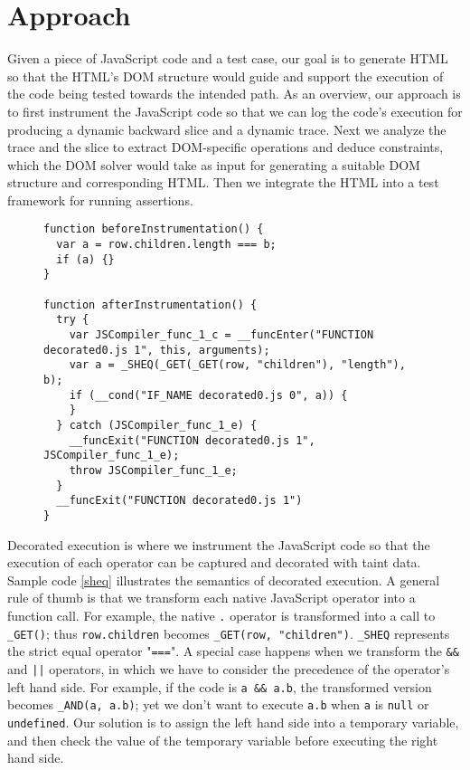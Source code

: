 \section{Approach}
Given a piece of JavaScript code and a test case, our goal is to generate HTML so that the HTML's DOM structure would guide and support the execution of the code being tested towards the intended path.  
As an overview, our approach is to first instrument the JavaScript code so that we can log the code's execution for producing a dynamic backward slice and a dynamic trace.  
Next we analyze the trace and the slice to extract DOM-specific operations and deduce constraints, which the DOM solver would take as input for generating a suitable DOM structure and corresponding HTML.  
Then we integrate the HTML into a test framework for running assertions.  


\begin{figure}
\begin{lstlisting}[caption=Example showing how code is decorated execution for dynamic tracing and dynamic backward slicing,label=sheq]  
function beforeInstrumentation() {
  var a = row.children.length === b; 
  if (a) {}
}

function afterInstrumentation() {
  try {
    var JSCompiler_func_1_c = __funcEnter("FUNCTION decorated0.js 1", this, arguments);
    var a = _SHEQ(_GET(_GET(row, "children"), "length"), b);
    if (__cond("IF_NAME decorated0.js 0", a)) {
    }
  } catch (JSCompiler_func_1_e) {
    __funcExit("FUNCTION decorated0.js 1", JSCompiler_func_1_e);
    throw JSCompiler_func_1_e;
  }
  __funcExit("FUNCTION decorated0.js 1")
}
\end{lstlisting}
\end{figure}

Decorated execution is where we instrument the JavaScript code so that the execution of each operator can be captured and decorated with taint data.  Sample code \ref{sheq} illustrates the semantics of decorated execution.  
A general rule of thumb is that we transform each native JavaScript operator into a function call.  For example, the native {\tt .} operator is transformed into a call to {\tt \_GET()}; thus {\tt row.children} becomes {\tt \_GET(row, "children")}.  {\tt \_SHEQ} represents the strict equal operator "{\tt ===}".  
A special case happens when we transform the {\tt \&\&} and {\tt |}{\tt |} operators, in which we have to consider the precedence of the operator's left hand side.   
For example, if the code is {\tt a \&\& a.b}, the transformed version becomes {\tt \_AND(a, a.b)}; yet we don't want to execute {\tt a.b} when {\tt a} is {\tt null} or {\tt undefined}.  Our solution is to assign the left hand side into a temporary variable, and then check the value of the temporary variable before executing the right hand side.

